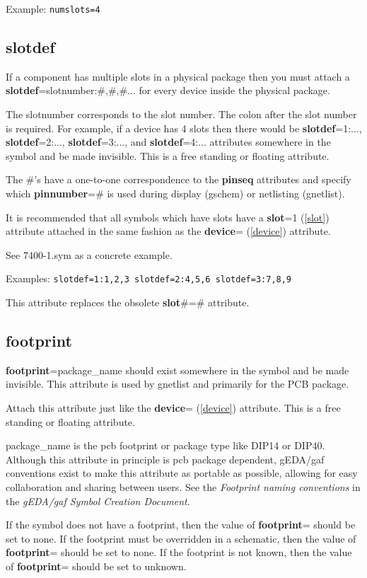 \documentclass{article}
\begin{document}
Example: \texttt{numslots=4}


\subsection{\bf slotdef\label{slotdef}}
If a component has multiple slots in a physical package then you must 
attach a {\bf slotdef}=slotnumber:\#,\#,\#... for every device inside
the physical package.

The slotnumber corresponds to the slot number.  The colon after the
slot number is required.  For example, if a device has 4 slots then there
would be {\bf slotdef}=1:..., {\bf slotdef}=2:..., {\bf slotdef}=3:...,
and {\bf slotdef}=4:...  attributes somewhere in the symbol and be
made invisible.  This is a free standing or floating attribute.

The \#'s have a one-to-one correspondence to the {\bf pinseq} attributes
and specify which {\bf pinnumber}=\# is used during display (gschem)
or netlisting (gnetlist).

It is recommended that all symbols which have slots have a {\bf slot}=1
(\ref{slot}) attribute attached in the same fashion as the {\bf device}=
(\ref{device}) attribute.

See 7400-1.sym as a concrete example.

Examples: \texttt{slotdef=1:1,2,3 slotdef=2:4,5,6 slotdef=3:7,8,9}

This attribute replaces the obsolete {\bf slot}\#=\# attribute.


\subsection{\bf footprint\label{footprint}}
{\bf footprint}=package\_name should exist somewhere in the symbol and
be made invisible.  This attribute is used by gnetlist and primarily
for the PCB package.

Attach this attribute just like the {\bf device}= (\ref{device})
attribute.  This is a free standing or floating attribute.

package\_name is the pcb footprint or package type like DIP14 or DIP40.
Although this attribute in principle is pcb package dependent, 
gEDA/gaf conventions exist to make this attribute as portable as
possible, allowing for easy collaboration and sharing between users.
See the {\it Footprint naming conventions} in the
{\it gEDA/gaf Symbol Creation Document}.

If the symbol does not have a footprint, then the value of {\bf
footprint}= should be set to none.  If the footprint must be overridden
in a schematic, then the value of {\bf footprint}= should be set to none.
If the footprint is not known, then the value of {\bf footprint}= should
be set to unknown.
\end{document}
